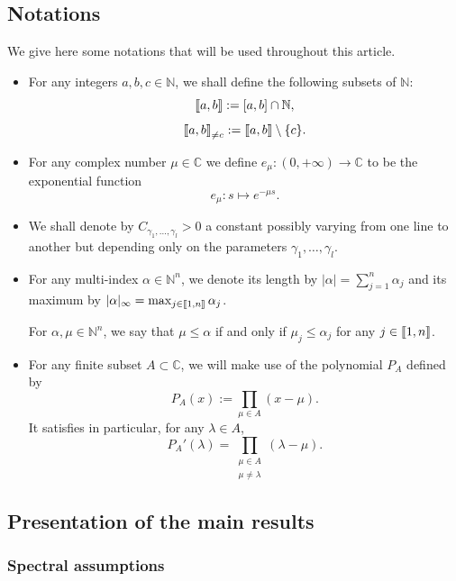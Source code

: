 \documentclass[AHL,Unicode,longabstracts]{cedram}
\newcommand{\llbracket}{\mathopen{[\mkern -2.7mu[}}
\newcommand{\rrbracket}{\mathclose{]\mkern -2.7mu]}}
\newcommand{\inter}[2]{\llbracket #1,#2 \rrbracket}
\newcommand{\interexclu}[3]{\llbracket #1,#2\rrbracket_{\neq #3}}
\newcommand{\N}{\mathbb{N}}
\newcommand{\C}{\mathbb{C}}
\begin{document}
\subsection{Notations}
We give here some notations that will be used throughout this article.
\begin{itemize}
\item For any integers $a,b,c\in \N$, we shall define the following subsets of $\N$:
\[
\inter{a}{b} := [a,b]\cap \N,
\]
\[
\interexclu{a}{b}{c} := \inter{a}{b}\setminus \{c\}.
\]
\item For any complex number $\mu\in \C$ we define $e_\mu:(0,+\infty)\to \C$ to be the exponential function
\begin{equation}\label{def_emu}
e_\mu:s\mapsto e^{-\mu s}.
\end{equation}
\item We shall denote by $C_{\gamma_1,\dotsc,\gamma_l}>0$ a constant possibly varying from one line to another but depending only on the parameters $\gamma_1,\dotsc,\gamma_l$.
\item For any multi-index $\alpha\in \N^n$, we denote its length by $|\alpha| = \sum_{j=1}^n \alpha_j$ and its maximum by $|\alpha|_\infty=\max_{j\in \inter{1}{n}} \alpha_j$.

For $\alpha,\mu\in \N^n$, we say that $\mu\leq \alpha$ if and only if $\mu_j\leq \alpha_j$ for any $j\in \inter{1}{n}$.
\item For any finite subset $A\subset \C$, we will make use of the polynomial $P_A$ defined by
\begin{equation}\label{Def:P}
P_A(x):=\prod_{\mu\in A} (x-\mu).
\end{equation}
It satisfies in particular, for any $\lambda\in A$,
\begin{equation*}\label{Def:P'}
P_A'(\lambda) = \prod_{ \substack{ \mu \in A \\ \mu \neq \lambda}} (\lambda - \mu).
\end{equation*}
\end{itemize}


\subsection{Presentation of the main results}

\subsubsection{Spectral assumptions} \label{Subsec:SpectralAssumptions}
\end{document}
